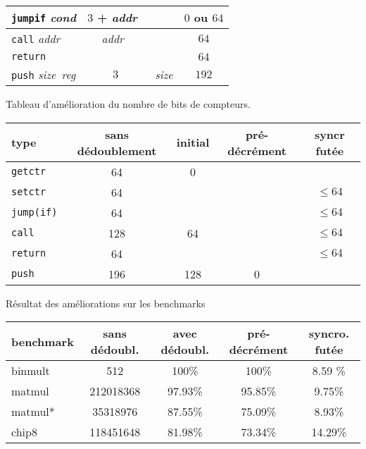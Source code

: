 \documentclass[architecture]{compas2018}
\newcommand{\reg}{\textit{reg}}
\newcommand{\cond}{\textit{cond}}
\newcommand{\size}{\textit{size}}
\newcommand{\addr}{\textit{addr}}
\begin{document}
\begin{table}[!h]
\begin{center}
\begin{tabular}{|l|c|c|c|}
    \hline
    \texttt{jumpif} \cond & $3$ + \addr\       &    & $0$ ou $64$       \\
    \hline
    \texttt{call} \addr   & \addr\             &    & $64$              \\
    \hline
    \texttt{return}       &       &    & $64$              \\
    \hline
    \texttt{push} \size\ \reg          & $3$   & \size           & $192$             \\
    \hline
  \end{tabular}
  \end{center}
Tableau d'amélioration du nombre de bits de compteurs.
  \begin{center}
    \begin{tabular}{|l|c|c|c|c|}
      \hline  
      type   & sans dédoublement  & initial         & pré-décrément & syncr futée    \\
      \hline  
      \hline
      \texttt{getctr}     & 64  & 0   &   &   \\
      \hline
      \texttt{setctr}     & 64  &     &   & $\leqslant 64$ \\
      \hline
      \texttt{jump(if)}   & 64  &     &   & $\leqslant 64$ \\
      \hline
      \texttt{call}       & 128 & 64  &   & $\leqslant 64$ \\
      \hline
      \texttt{return}     & 64  &     &   & $\leqslant64$  \\
      \hline
      \texttt{push}       & 196 & 128 & 0 &  \\
      \hline
    \end{tabular}
  \end{center}
  Résultat des améliorations sur les benchmarks
  \begin{center}
    \begin{tabular}{|l|c|c|c|c|}
      
      \hline  
      benchmark   & sans dédoubl.  & avec dédoubl.  & pré-décrément & syncro. futée    \\
      \hline  
      \hline
      binmult & 512 & 100\% & 100\% & 8.59 \% \\
      \hline
      matmul & 212018368 & 97.93\% & 95.85\% & 9.75\% \\
      \hline
      matmul* & 35318976 & 87.55\% & 75.09\% & 8.93\% \\
      \hline
      chip8 & 118451648 & 81.98\% & 73.34\% & 14.29\% \\
      
      \hline
    \end{tabular}
  \end{center}

\end{table}
\end{document}
